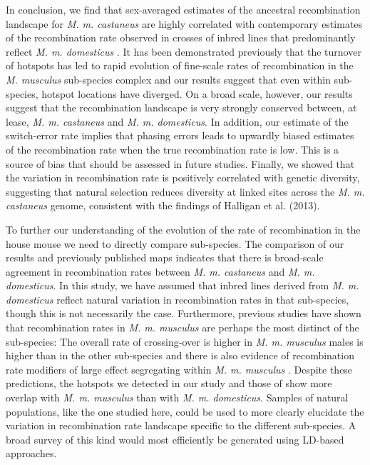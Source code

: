 In conclusion, we find that sex-averaged estimates of the ancestral recombination landscape for \emph{M. m. castaneus} are highly correlated with contemporary estimates of the recombination rate observed in crosses of inbred lines that predominantly reflect \emph{M. m. domesticus} \citep{RN232}. It has been demonstrated previously that the turnover of hotspots has led to rapid evolution of fine-scale rates of recombination in the \emph{M. musculus} sub-species complex \citep{RN249} and our results suggest that even within sub-species, hotspot locations have diverged. On a broad scale, however, our results suggest that the recombination landscape is very strongly conserved between, at lease, \emph{M. m. castaneus} and \emph{M. m. domesticus}. In addition, our estimate of the switch-error rate implies that phasing errors leads to upwardly biased estimates of the recombination rate when the true recombination rate is low. This is a source of bias that should be assessed in future studies. Finally, we showed that the variation in recombination rate is positively correlated with genetic diversity, suggesting that natural selection reduces diversity at linked sites across the \emph{M. m. castaneus} genome, consistent with the findings of Halligan et al. (2013). 
 
To further our understanding of the evolution of the rate of recombination in the house mouse we need to directly compare sub-species. The comparison of our results and previously published maps indicates that there is broad-scale agreement in recombination rates between \emph{M. m. castaneus} and \emph{M. m. domesticus}. In this study, we have assumed that inbred lines derived from \emph{M. m. domesticus} reflect natural variation in recombination rates in that sub-species, though this is not necessarily the case.  Furthermore, previous studies have shown that recombination rates in \emph{M. m. musculus} are perhaps the most distinct of the sub-species: The overall rate of crossing-over is higher in \emph{M. m. musculus} males is higher than in the other sub-species \citep{RN270} and there is also evidence of recombination rate modifiers of large effect segregating within \emph{M. m. musculus} \citep{RN244}. Despite these predictions, the hotspots we detected in our study and those of \cite{RN249} show more overlap with \emph{M. m. musculus} than with \emph{M. m. domesticus}. Samples of natural populations, like the one studied here, could be used to more clearly elucidate the variation in recombination rate landscape specific to the different sub-species. A broad survey of this kind would most efficiently be generated using LD-based approaches.  
